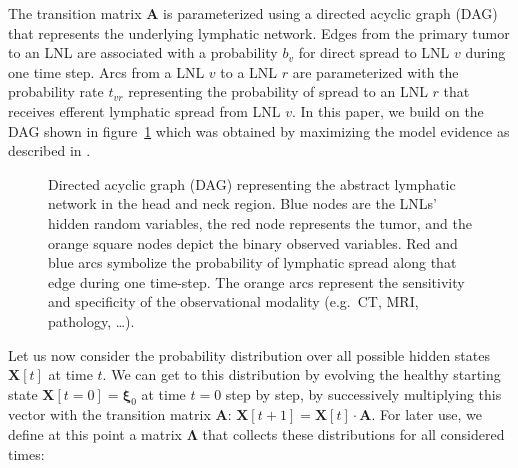 \documentclass[
  sn-mathphys-num,
]{sn-jnl}
\begin{document}
The transition matrix \(\mathbf{A}\) is parameterized using a directed
acyclic graph (DAG) that represents the underlying lymphatic network.
Edges from the primary tumor to an LNL are associated with a probability
\(b_v\) for direct spread to LNL \(v\) during one time step. Arcs from a
LNL \(v\) to a LNL \(r\) are parameterized with the probability rate
\(t_{vr}\) representing the probability of spread to an LNL \(r\) that
receives efferent lymphatic spread from LNL \(v\). In this paper, we
build on the DAG shown in figure~\ref{fig-full-graph} which was obtained
by maximizing the model evidence as described in
\citep{ludwig_modelling_2024}.

\begin{figure}


\caption{\label{fig-full-graph}Directed acyclic graph (DAG) representing
the abstract lymphatic network in the head and neck region. Blue nodes
are the LNLs' hidden random variables, the red node represents the
tumor, and the orange square nodes depict the binary observed variables.
Red and blue arcs symbolize the probability of lymphatic spread along
that edge during one time-step. The orange arcs represent the
sensitivity and specificity of the observational modality (e.g.~CT, MRI,
pathology, \ldots).}

\end{figure}%

Let us now consider the probability distribution over all possible
hidden states \(\mathbf{X}[t]\) at time \(t\). We can get to this
distribution by evolving the healthy starting state
\(\mathbf{X}[t=0] = \boldsymbol{\xi}_0\) at time \(t=0\) step by step,
by successively multiplying this vector with the transition matrix
\(\mathbf{A}\): \(\mathbf{X}[t+1] = \mathbf{X}[t] \cdot \mathbf{A}\).
For later use, we define at this point a matrix \(\boldsymbol{\Lambda}\)
that collects these distributions for all considered times:
\end{document}
